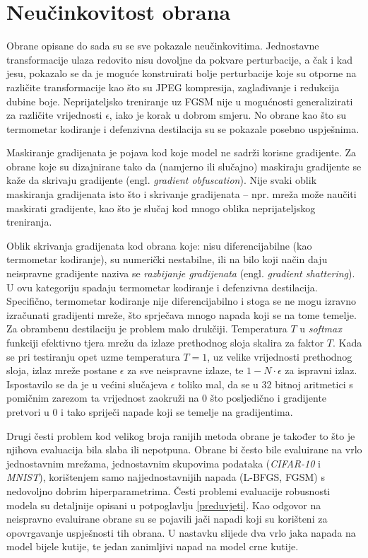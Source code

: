 \documentclass[utf8, diplomski]{fer}
\begin{document}
\section{Neučinkovitost obrana}\label{neucinkovitost}
Obrane opisane do sada su se sve pokazale neučinkovitima. Jednostavne transformacije ulaza redovito nisu dovoljne da pokvare perturbacije, a čak i kad jesu, pokazalo se da je moguće konstruirati bolje perturbacije koje su otporne na različite transformacije kao što su JPEG kompresija, zaglađivanje i redukcija dubine boje. Neprijateljsko treniranje uz FGSM nije u mogućnosti generalizirati za različite vrijednosti $\epsilon$, iako je korak u dobrom smjeru. No obrane kao što su termometar kodiranje i defenzivna destilacija su se pokazale posebno uspješnima. \par
Maskiranje gradijenata je pojava kod koje model ne sadrži korisne gradijente. Za obrane koje su dizajnirane tako da (namjerno ili slučajno) maskiraju gradijente se kaže da skrivaju gradijente (engl. \textit{gradient obfuscation})\citep{obfuscated}. Nije svaki oblik maskiranja gradijenata isto što i skrivanje gradijenata -- npr. mreža može naučiti maskirati gradijente, kao što je slučaj kod mnogo oblika neprijateljskog treniranja\citep{ensemble_training}. \par
Oblik skrivanja gradijenata kod obrana koje: nisu diferencijabilne (kao termometar kodiranje), su numerički nestabilne, ili na bilo koji način daju neispravne gradijente naziva se \textit{razbijanje gradijenata} (engl. \textit{gradient shattering})\citep{obfuscated}. U ovu kategoriju spadaju termometar kodiranje i defenzivna destilacija. Specifično, termometar kodiranje nije diferencijabilno i stoga se ne mogu izravno izračunati gradijenti mreže, što sprječava mnogo napada koji se na tome temelje. \\ Za obrambenu destilaciju je problem malo drukčiji. Temperatura $T$ u \textit{softmax} funkciji efektivno tjera mrežu da izlaze prethodnog sloja skalira za faktor $T$. Kada se pri testiranju opet uzme temperatura $T = 1$, uz velike vrijednosti prethodnog sloja, izlaz mreže postane $\epsilon$ za sve neispravne izlaze, te $1 - N \cdot \epsilon$ za ispravni izlaz. Ispostavilo se da je u većini slučajeva $\epsilon$ toliko mal, da se u 32 bitnoj aritmetici s pomičnim zarezom ta vrijednost zaokruži na $0$ što posljedično i gradijente pretvori u $0$ i tako spriječi napade koji se temelje na gradijentima. \par
Drugi česti problem kod velikog broja ranijih metoda obrane je također to što je njihova evaluacija bila slaba ili nepotpuna. Obrane bi često bile evaluirane na vrlo jednostavnim mrežama, jednostavnim skupovima podataka (\textit{CIFAR-10} i \textit{MNIST}), korištenjem samo najjednostavnijih napada (L-BFGS, FGSM) s nedovoljno dobrim hiperparametrima. Česti problemi evaluacije robusnosti modela su detaljnije opisani u potpoglavlju \ref{preduvjeti}. Kao odgovor na neispravno evaluirane obrane su se pojavili jači napadi koji su korišteni za opovrgavanje uspješnosti tih obrana. U nastavku slijede dva vrlo jaka napada na model bijele kutije, te jedan zanimljivi napad na model crne kutije.
\end{document}

